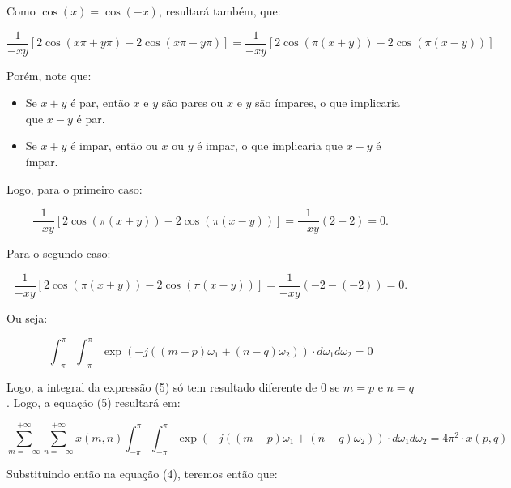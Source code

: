 \documentclass[]{abntex2}
\begin{document}
\begin{itemize}
	Como $\cos (x) = \cos (-x)$, resultará também, que:

	\begin{equation*}
		\dfrac{1}{-xy} [2\cos \left(x \pi + y \pi \right) - 2\cos \left(x \pi - y \pi \right)] = \dfrac{1}{-xy} [2\cos \left(\pi(x + y) \right) - 2\cos \left(\pi(x - y) \right)] 
	\end{equation*}

	Porém, note que:

	\begin{itemize}
		\item Se $x + y$ é par, então $x$ e $y$ são pares ou $x$ e $y$ são ímpares, o que implicaria que $x-y$ é par.
		\item Se $x + y$ é impar, então ou $x$ ou $y$ é impar, o que implicaria que $x-y$ é ímpar.
	\end{itemize}

	Logo, para o primeiro caso:

	\begin{equation*}
		\dfrac{1}{-xy} [2\cos \left(\pi(x + y) \right) - 2\cos \left(\pi(x - y) \right)] = \dfrac{1}{-xy} (2-2) = 0. 
	\end{equation*}

	Para o segundo caso:

	\begin{equation*}
		\dfrac{1}{-xy} [2\cos \left(\pi(x + y) \right) - 2\cos \left(\pi(x - y) \right)] = \dfrac{1}{-xy} (-2-(-2)) = 0. 
	\end{equation*}

	Ou seja:

	\begin{equation*}
		\int_{-\pi}^{\pi} \int_{-\pi}^{\pi}\exp \left( -j ((m-p) \omega_1 + (n-q) \omega_2) \right) \cdot d\omega_1 d\omega_2 = 0
	\end{equation*}

\end{itemize}

Logo, a integral da expressão (5) só tem resultado diferente de 0 se $m=p$ e $n=q$. Logo, a equação (5) resultará em:

\begin{equation*}
	\sum_{m=-\infty}^{+\infty} \sum_{n=-\infty}^{+\infty} x(m, n) \int_{-\pi}^{\pi} \int_{-\pi}^{\pi}\exp \left( -j ((m-p) \omega_1 + (n-q) \omega_2) \right) \cdot d\omega_1 d\omega_2 = 4\pi^{2}\cdot x(p,q)
\end{equation*}

Substituindo então na equação (4), teremos então que:
\end{document}

